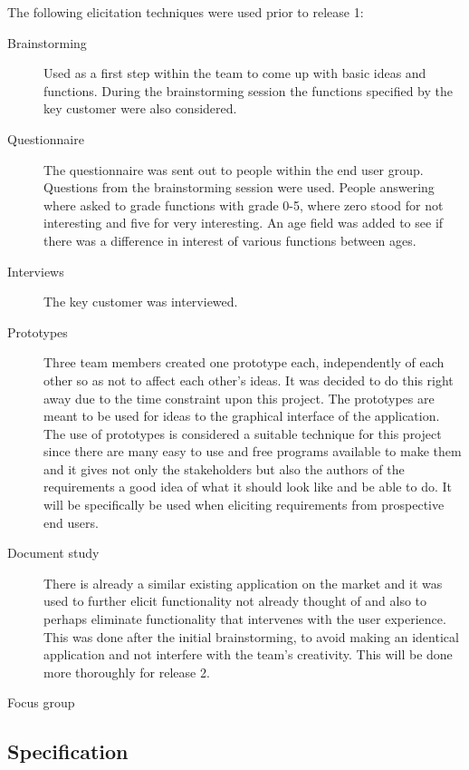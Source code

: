\documentclass[10pt,a4paper]{article}
\begin{document}
The following elicitation techniques were used prior to release 1:
\begin{description}
\item[Brainstorming] Used as a first step within the team to come up with basic ideas and functions. During the brainstorming session the functions specified by the key customer were also considered.

\item[Questionnaire] The questionnaire was sent out to people within the end user group. Questions from the brainstorming session were used. People answering where asked to grade functions with grade 0-5, where zero stood for not interesting and five for very interesting. An age field was added to see if there was a difference in interest of various functions between ages. 

\item[Interviews] The key customer was interviewed.

\item[Prototypes] Three team members created one prototype each, independently of each other so as not to affect each other's ideas. It was decided to do this right away due to the time constraint upon this project. The prototypes are meant to be used for ideas to the graphical interface of the application. The use of prototypes is considered a suitable technique for this project since there are many easy to use and free programs available to make them and it gives not only the stakeholders but also the authors of the requirements a good idea of what it should look like and be able to do. It will be specifically be used when eliciting requirements from prospective end users.

\item[Document study] There is already a similar existing application on the market and it was used to further elicit functionality not already thought of and also to perhaps eliminate functionality that intervenes with the user experience. This was done after the initial brainstorming, to avoid making an identical application and not interfere with the team's creativity. This will be done more thoroughly for release 2.

\item[Focus group]

\end{description}


\subsection{Specification}
\end{document}

